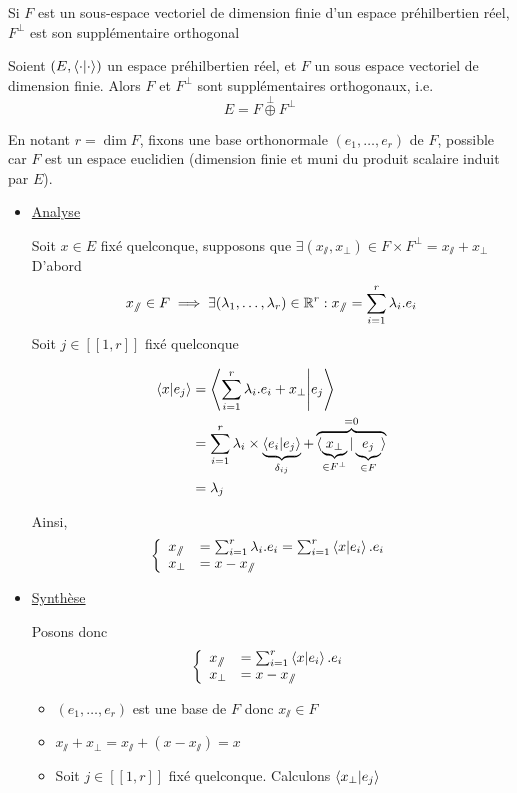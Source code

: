 \documentclass{article}
\begin{document}
\begin{question_kholle}{Si $F$ est un sous-espace vectoriel de dimension finie d'un espace préhilbertien réel, $F^{\perp}$ est son supplémentaire orthogonal}
	
	
	Soient $(E, \braket{ \cdot | \cdot })$ un espace préhilbertien réel, et $F$ un sous espace vectoriel de dimension finie.
	Alors $F$ et $F^{\perp}$ sont supplémentaires orthogonaux, i.e.
	\begin{equation}
		E = F  \overset{\perp}{\oplus} F^{\perp}
	\end{equation}
	
	
	
	En notant $r = \dim F$, fixons une base orthonormale $(e_{1}, \dots, e_{r})$ de $F$, possible car $F$ est un espace euclidien (dimension finie et muni du produit scalaire induit par $E$).
	\begin{itemize}[label=$\lozenge$]
		\item \underline{Analyse}
		
		Soit $x \in E$ fixé quelconque, supposons que $\exists (x_{\sslash}, x_{\perp}) \in F \times F^{\perp} = x_{\sslash}+x_{\perp}$
		D'abord $$x_{\sslash} \in F \implies \exists (\lambda_{1}, \dots, \lambda_{r}) \in \mathbb R^{r}: x_{\sslash}= \sum_{i=1}^{r}\lambda_{i}.e_{i}$$
		Soit $j \in [ \! [ 1, r ] \!]$ fixé quelconque
		
		\begin{align*}
			\braket{ x | e_{j} } &=   \left\langle \sum_{i=1}^{r}\lambda_{i}.e_{i} + x_{\perp} \Bigg| e_{j}  \right\rangle   \\
			&= \sum_{i=1}^{r}\lambda_{i}\times \underbrace{ \braket{ e_{i} | e_{j} } }_{ \delta_{ij} }  + \overbrace{ \braket{ \underbrace{ x_{\perp} }_{ \in F^{\perp} } | \underbrace{ e_{j} }_{ \in F } } }^{ =0 }  \\
			&= \lambda_{j}
		\end{align*}
		
		Ainsi, $$\left\{ \begin{array}{ll}
			x_{\sslash} &= \sum_{i=1}^{r}\lambda_{i}.e_{i}= \sum_{i=1}^{r}\braket{ x | e_{i} } . e_{i} \\
			x_{\perp}  &= x - x_{\sslash}
		\end{array}\right.$$
		
		\item \underline{Synthèse}
		
		Posons donc 
		$$\left\{ \begin{array}{ll}
			x_{\sslash} &= \sum_{i=1}^{r} \braket{ x | e_{i} } .e_{i} \\
			x_{\perp} &= x - x_{\sslash}
		\end{array}\right. $$
		\begin{itemize}[label=$\star$]
			\item $(e_{1}, \dots, e_{r})$ est une base de $F$ donc $x_{\sslash} \in F$
			\item $x_{\sslash}+x_{\perp} = x_{\sslash}+ (x - x_{\sslash}) = x$
			\item Soit $j \in [ \! [ 1, r ] \!]$ fixé quelconque. Calculons $\braket{ x_{\perp} | e_{j} }$
			

\end{itemize}
\end{itemize}
\end{question_kholle}
\end{document}
